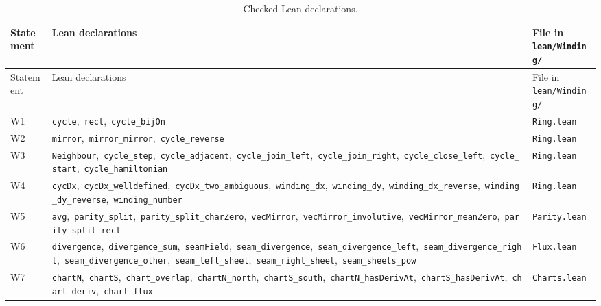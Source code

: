 \documentclass[11pt,a4paper]{article}
\theoremstyle{definition}
\begin{document}
{\small
\begin{longtable}{@{}l>{\raggedright\arraybackslash}p{}l@{}}
\caption{Checked Lean declarations.}\label{tab:lean}\\
\toprule
Statement & Lean declarations & File in \texttt{lean/Winding/}\\
\midrule
\endfirsthead
\toprule
Statement & Lean declarations & File in \texttt{lean/Winding/}\\
\midrule
\endhead
\bottomrule
\endfoot
W1 & \texttt{cycle},\allowbreak\ \texttt{rect},\allowbreak\ \texttt{cycle\_bijOn} & \texttt{Ring.lean}\\
W2 & \texttt{mirror},\allowbreak\ \texttt{mirror\_mirror},\allowbreak\ \texttt{cycle\_reverse} & \texttt{Ring.lean}\\
W3 & \texttt{Neighbour},\allowbreak\ \texttt{cycle\_step},\allowbreak\ \texttt{cycle\_adjacent},\allowbreak\ \texttt{cycle\_join\_left},\allowbreak\ \texttt{cycle\_join\_right},\allowbreak\ \texttt{cycle\_close\_left},\allowbreak\ \texttt{cycle\_start},\allowbreak\ \texttt{cycle\_hamiltonian} & \texttt{Ring.lean}\\
W4 & \texttt{cycDx},\allowbreak\ \texttt{cycDx\_welldefined},\allowbreak\ \texttt{cycDx\_two\_ambiguous},\allowbreak\ \texttt{winding\_dx},\allowbreak\ \texttt{winding\_dy},\allowbreak\ \texttt{winding\_dx\_reverse},\allowbreak\ \texttt{winding\_dy\_reverse},\allowbreak\ \texttt{winding\_number} & \texttt{Ring.lean}\\
W5 & \texttt{avg},\allowbreak\ \texttt{parity\_split},\allowbreak\ \texttt{parity\_split\_charZero},\allowbreak\ \texttt{vecMirror},\allowbreak\ \texttt{vecMirror\_involutive},\allowbreak\ \texttt{vecMirror\_meanZero},\allowbreak\ \texttt{parity\_split\_rect} & \texttt{Parity.lean}\\
W6 & \texttt{divergence},\allowbreak\ \texttt{divergence\_sum},\allowbreak\ \texttt{seamField},\allowbreak\ \texttt{seam\_divergence},\allowbreak\ \texttt{seam\_divergence\_left},\allowbreak\ \texttt{seam\_divergence\_right},\allowbreak\ \texttt{seam\_divergence\_other},\allowbreak\ \texttt{seam\_left\_sheet},\allowbreak\ \texttt{seam\_right\_sheet},\allowbreak\ \texttt{seam\_sheets\_pow} & \texttt{Flux.lean}\\
W7 & \texttt{chartN},\allowbreak\ \texttt{chartS},\allowbreak\ \texttt{chart\_overlap},\allowbreak\ \texttt{chartN\_north},\allowbreak\ \texttt{chartS\_south},\allowbreak\ \texttt{chartN\_hasDerivAt},\allowbreak\ \texttt{chartS\_hasDerivAt},\allowbreak\ \texttt{chart\_deriv},\allowbreak\ \texttt{chart\_flux} & \texttt{Charts.lean}\\

\end{longtable}}
\end{document}
